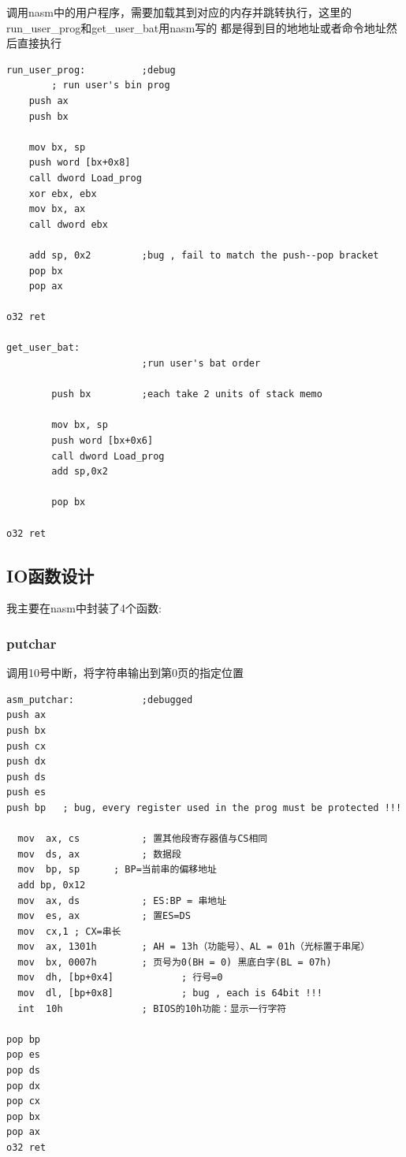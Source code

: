 \documentclass[a4paper,11pt,UTF8]{ctexart}
\begin{document}
  调用nasm中的用户程序，需要加载其到对应的内存并跳转执行，这里的run\_user\_prog和get\_user\_bat用nasm写的
  都是得到目的地地址或者命令地址然后直接执行
      \begin{lstlisting}[caption={asm code },tabsize=4,basicstyle=\footnotesize,captionpos=b]
run_user_prog:			;debug
        ; run user's bin prog
    push ax
    push bx

    mov bx, sp
    push word [bx+0x8]
    call dword Load_prog	
    xor ebx, ebx
    mov bx, ax
    call dword ebx

    add sp, 0x2  		;bug , fail to match the push--pop bracket 
    pop bx
    pop ax

o32 ret   

get_user_bat:
						;run user's bat order

		push bx			;each take 2 units of stack memo

		mov bx, sp
		push word [bx+0x6]
		call dword Load_prog
		add sp,0x2

		pop bx

o32	ret

      \end{lstlisting}
       
      \subsection{IO函数设计}
      我主要在nasm中封装了4个函数:
        \subsubsection{putchar}
        调用10号中断，将字符串输出到第0页的指定位置
        \begin{lstlisting}[caption={asm code },tabsize=4,basicstyle=\footnotesize,captionpos=b]
asm_putchar:			;debugged
push ax
push bx
push cx
push dx
push ds
push es
push bp   ; bug, every register used in the prog must be protected !!!

  mov  ax, cs           ; 置其他段寄存器值与CS相同
  mov  ds, ax           ; 数据段
  mov  bp, sp      ; BP=当前串的偏移地址
  add bp, 0x12
  mov  ax, ds           ; ES:BP = 串地址
  mov  es, ax           ; 置ES=DS
  mov  cx,1 ; CX=串长
  mov  ax, 1301h        ; AH = 13h（功能号）、AL = 01h（光标置于串尾）
  mov  bx, 0007h        ; 页号为0(BH = 0) 黑底白字(BL = 07h)
  mov  dh, [bp+0x4]            ; 行号=0
  mov  dl, [bp+0x8]            ; bug , each is 64bit !!!
  int  10h              ; BIOS的10h功能：显示一行字符

pop bp
pop es
pop ds
pop dx
pop cx
pop bx
pop ax
o32	ret          
        \end{lstlisting}              
\end{document}
